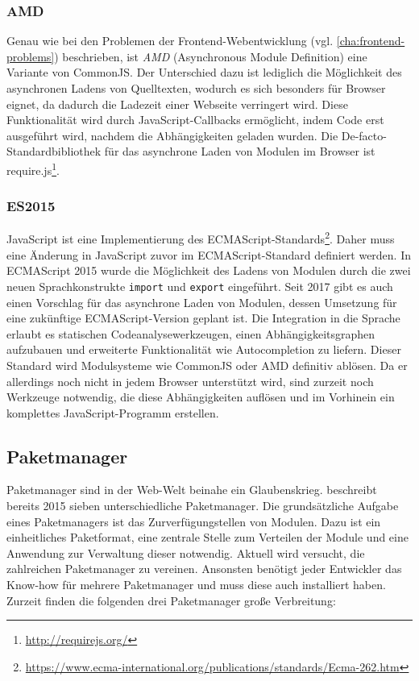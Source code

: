 \subsubsection{AMD}
\label{sub:amd}
Genau wie bei den Problemen der Frontend-Webentwicklung (vgl. \cref{cha:frontend-problems}) beschrieben, ist \emph{AMD} (Asynchronous Module Definition) eine Variante von CommonJS.
Der Unterschied dazu ist lediglich die Möglichkeit des asynchronen Ladens von Quelltexten, wodurch es sich besonders für Browser eignet, da dadurch die Ladezeit einer Webseite verringert wird.
Diese Funktionalität wird durch JavaScript-Callbacks ermöglicht, indem Code erst ausgeführt wird, nachdem die Abhängigkeiten geladen wurden.
Die De-facto-Standardbibliothek für das asynchrone Laden von Modulen im Browser ist require.js\footnote{\url{http://requirejs.org/}}.

\subsubsection{ES2015}
\label{sub:es2015}
JavaScript ist eine Implementierung des ECMAScript-Standards\footnote{\url{https://www.ecma-international.org/publications/standards/Ecma-262.htm}}.
Daher muss eine Änderung in JavaScript zuvor im ECMAScript-Standard definiert werden.
In ECMAScript 2015 wurde die Möglichkeit des Ladens von Modulen durch die zwei neuen Sprachkonstrukte \verb|import| und \verb|export| eingeführt.
Seit 2017 gibt es auch einen Vorschlag für das asynchrone Laden von Modulen, dessen Umsetzung für eine zukünftige ECMAScript-Version geplant ist.
Die Integration in die Sprache erlaubt es statischen Codeanalysewerkzeugen, einen Abhängigkeitsgraphen aufzubauen und erweiterte Funktionalität wie Autocompletion zu liefern.
Dieser Standard wird Modulsysteme wie CommonJS oder AMD definitiv ablösen.
Da er allerdings noch nicht in jedem Browser unterstützt wird, sind zurzeit noch Werkzeuge notwendig, die diese Abhängigkeiten auflösen und im Vorhinein ein komplettes JavaScript-Programm erstellen.


\subsection{Paketmanager}
\label{sub:package-managers}
Paketmanager sind in der Web-Welt beinahe ein Glaubenskrieg.
\autocite{Farmer.package-managers:online} beschreibt bereits 2015 sieben unterschiedliche Paketmanager.
Die grundsätzliche Aufgabe eines Paketmanagers ist das Zurverfügungstellen von Modulen.
Dazu ist ein einheitliches Paketformat, eine zentrale Stelle zum Verteilen der Module und eine Anwendung zur Verwaltung dieser notwendig.
Aktuell wird versucht, die zahlreichen Paketmanager zu vereinen.
Ansonsten benötigt jeder Entwickler das Know-how für mehrere Paketmanager und muss diese auch installiert haben.
Zurzeit finden die folgenden drei Paketmanager große Verbreitung:

